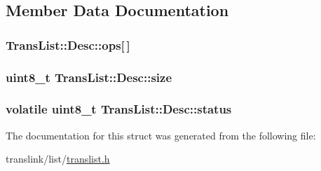 \subsection{Member Data Documentation}
\hypertarget{structTransList_1_1Desc_a9785f2851b9f4191e2001ff387a08b8a}{
\subsubsection[{ops}]{ Trans\-List\-::\-Desc\-::ops\mbox{[}$\,$\mbox{]}}}\label{structTransList_1_1Desc_a9785f2851b9f4191e2001ff387a08b8a}
\hypertarget{structTransList_1_1Desc_a3c4b261c8c0020499f46a2f7b04a6c0c}{
\subsubsection[{size}]{\setlength{\rightskip}{0pt plus 5cm}uint8\-\_\-t Trans\-List\-::\-Desc\-::size}}\label{structTransList_1_1Desc_a3c4b261c8c0020499f46a2f7b04a6c0c}
\hypertarget{structTransList_1_1Desc_a6c5518f6f12c4f00d820c431685f0557}{
\subsubsection[{status}]{\setlength{\rightskip}{0pt plus 5cm}volatile uint8\-\_\-t Trans\-List\-::\-Desc\-::status}}\label{structTransList_1_1Desc_a6c5518f6f12c4f00d820c431685f0557}


The documentation for this struct was generated from the following file\-:\begin{DoxyCompactItemize}
\item 
translink/list/\hyperlink{translist_8h}{translist.\-h}\end{DoxyCompactItemize}
